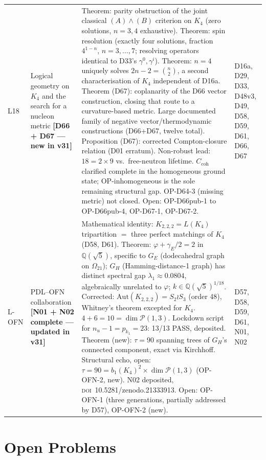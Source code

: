 \documentclass[11pt,a4paper]{article}
\theoremstyle{plain}
\theoremstyle{definition}
\theoremstyle{remark}
\newcommand{\Ccoh}{C_{\mathrm{coh}}}
\begin{document}
\begin{longtable}{L{0.6cm}L{3.0cm}L{5.5cm}L{4.0cm}}
L18 & Logical geometry on $K_4$ and the search for a nucleon metric \textbf{[D66 + D67 --- new in v31]} & \textcolor{proofblue}{Theorem}: parity obstruction of the joint classical $(A)\wedge(B)$ criterion on $K_4$ (zero solutions, $n=3,4$ exhaustive). \textcolor{proofblue}{Theorem}: spin resolution (exactly four solutions, fraction $4^{1-n}$, $n=3,\ldots,7$; resolving operators identical to D33's $\gamma^0,\gamma^i$). \textcolor{proofblue}{Theorem}: $n=4$ uniquely solves $2n-2=\binom{n}{2}$, a second characterisation of $K_4$ independent of D16a. \textcolor{proofblue}{Theorem} (D67): coplanarity of the D66 vector construction, closing that route to a curvature-based metric. Large documented family of negative vector/thermodynamic constructions (D66+D67, twelve total). \textcolor{proofblue}{Proposition} (D67): corrected Compton-closure relation (D01 erratum). Non-robust lead: $18=2\times9$ vs.\ free-neutron lifetime. $\Ccoh$ clarified complete in the homogeneous ground state; OP-inhomogeneous is the sole remaining structural gap. OP-D64-3 (missing metric) not closed. Open: OP-D66pub-1 to OP-D66pub-4, OP-D67-1, OP-D67-2. & D16a, D29, D33, D48v3, D49, D58, D59, D61, D66, D67\\[0.3em]
L-OFN & PDL--OFN collaboration \textbf{[N01 + N02 complete --- updated in v31]} & \textcolor{proofblue}{Mathematical identity}: $K_{2,2,2}=L(K_4)$ tripartition $=$ three perfect matchings of $K_4$ (D58, D61). \textcolor{proofblue}{Theorem}: $\varphi+\gamma_E/2=2$ in $\mathbb{Q}(\sqrt{5})$, specific to $G_E$ (dodecahedral graph on $\Omega_{21}$); $G_H$ (Hamming-distance-1 graph) has distinct spectral gap $\lambda_1\approx0.0804$, algebraically unrelated to $\varphi$; $k\in\mathbb{Q}(\sqrt{5})^{1/18}$. \textcolor{proofblue}{Corrected}: $\mathrm{Aut}(K_{2,2,2})=S_2\wr S_3$ (order 48), Whitney's theorem excepted for $K_4$. $4+6=10=\dim\mathcal{P}(1,3)$. Lockdown script for $n_u-1=p_{k_1}=23$: 13/13 PASS, deposited. \textcolor{proofblue}{Theorem} (new): $\tau=90$ spanning trees of $G_H$'s connected component, exact via Kirchhoff. \textcolor{openproblemred}{Structural echo, open}: $\tau=90=b_1(K_4)^2\times\dim\mathcal P(1,3)$ (OP-OFN-2, new). N02 deposited, \textsc{doi}~10.5281/zenodo.21333913. Open: OP-OFN-1 (three generations, partially addressed by D57), OP-OFN-2 (new). & D57, D58, D59, D61, N01, N02\\[0.3em]
\end{longtable}

\section{Open Problems}
\label{sec:openproblems}
\end{document}
